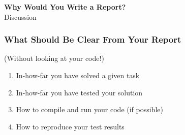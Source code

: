 \begin{frame}

\vspace{\fill}

\begin{center}

\Large


\textbf{Why Would You Write a Report?} \\[2em]

Discussion

\end{center}

\vspace{\fill}

\end{frame}

\begin{frame}

\frametitle{What Should Be Clear From Your Report}

(Without looking at your code!)

\vspace{\fill}

\begin{enumerate}

\item In-how-far you have solved a given task

\item In-how-far you have tested your solution

\item How to compile and run your code (if possible)

\item How to reproduce your test results

\end{enumerate}

\vspace{\fill}

\end{frame}


